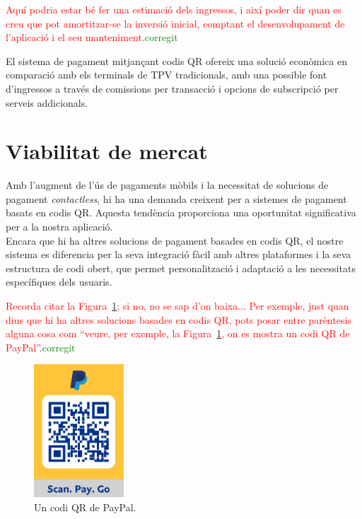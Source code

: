 \documentclass[a4paper,12pt,twoside]{ThesisStyle}
\newcommand{\pau}[1]{\textcolor{red}{#1}}
\newcommand{\sudan}[1]{\textcolor{green}{#1}}
\begin{document}
\pau{Aquí podria estar bé fer una estimació dels ingressos, i així poder dir quan es creu que pot amortitzar-se la inversió inicial, comptant el desenvolupament de l'aplicació i el seu manteniment.}\sudan{corregit}

El sistema de pagament mitjançant codis QR ofereix una solució econòmica en comparació amb els terminals de TPV tradicionals, amb una possible font d'ingressos a través de comissions per transacció i opcions de subscripció per serveis addicionals.




\section{Viabilitat de mercat}
\label{subsec:Viabilitat de mercat}

Amb l'augment de l'ús de pagaments mòbils i la necessitat de solucions de pagament \textit{contactless}, hi ha una demanda creixent per a sistemes de pagament basats en codis QR. Aquesta tendència proporciona una oportunitat significativa per a la nostra aplicació.\\

Encara que hi ha altres solucions de pagament basades en codis QR, el nostre sistema es diferencia per la seva integració fàcil amb altres plataformes i la seva estructura de codi obert, que permet personalització i adaptació a les necessitats específiques dels usuaris.



\pau{Recorda citar la Figura~\ref{fig:Un codi QR de Paypal}; si no, no se sap d'on baixa... Per exemple, just quan dius que hi ha altres solucions basades en codis QR, pots posar entre parèntesis alguna cosa com ``veure, per exemple, la Figura~\ref{fig:Un codi QR de Paypal}, on es mostra un codi QR de PayPal''.}\sudan{corregit}

\begin{figure}[h!] %
    \centering
    \includegraphics[width=0.3\textwidth]{imatges/paypal.png} %
    \caption{Un codi QR de PayPal.} %
    \label{fig:Un codi QR de Paypal} %
  \end{figure}
\end{document}
